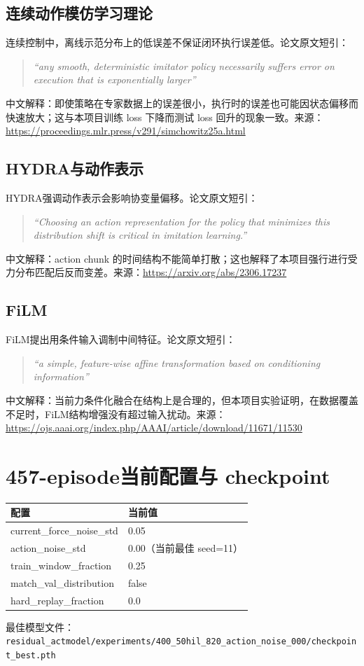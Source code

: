 \documentclass[UTF8,a4paper,11pt,fontset=none]{ctexart}
\begin{document}
\subsection{连续动作模仿学习理论}
连续控制中，离线示范分布上的低误差不保证闭环执行误差低。论文原文短引：\begin{quote}\emph{``any smooth, deterministic imitator policy necessarily suffers error on execution that is exponentially larger''}\end{quote}
中文解释：即使策略在专家数据上的误差很小，执行时的误差也可能因状态偏移而快速放大；这与本项目训练 loss 下降而测试 loss 回升的现象一致。来源：\url{https://proceedings.mlr.press/v291/simchowitz25a.html}

\subsection{HYDRA与动作表示}
HYDRA强调动作表示会影响协变量偏移。论文原文短引：\begin{quote}\emph{``Choosing an action representation for the policy that minimizes this distribution shift is critical in imitation learning.''}\end{quote}
中文解释：action chunk 的时间结构不能简单打散；这也解释了本项目强行进行受力分布匹配后反而变差。来源：\url{https://arxiv.org/abs/2306.17237}

\subsection{FiLM}
FiLM提出用条件输入调制中间特征。论文原文短引：\begin{quote}\emph{``a simple, feature-wise affine transformation based on conditioning information''}\end{quote}
中文解释：当前力条件化融合在结构上是合理的，但本项目实验证明，在数据覆盖不足时，FiLM结构增强没有超过输入扰动。来源：\url{https://ojs.aaai.org/index.php/AAAI/article/download/11671/11530}

\section{457-episode当前配置与 checkpoint}
\begin{tabularx}{\textwidth}{>{\ttfamily}p{}Y}
\toprule 配置 & 当前值 \\
\midrule
current\_force\_noise\_std & 0.05 \\
action\_noise\_std & 0.00（当前最佳 seed=11） \\
train\_window\_fraction & 0.25 \\
match\_val\_distribution & false \\
hard\_replay\_fraction & 0.0 \\
\bottomrule
\end{tabularx}
\vspace{1em}
最佳模型文件：\texttt{residual\_actmodel/experiments/400\_50hil\_820\_action\_noise\_000/checkpoint\_best.pth}
\end{document}
